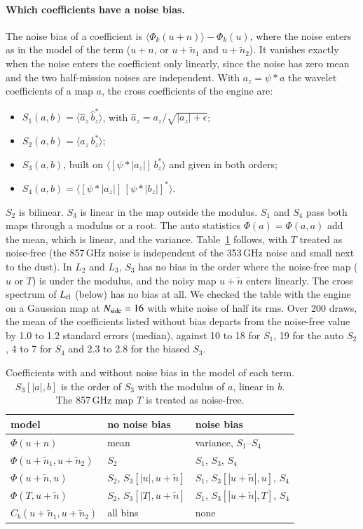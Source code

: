 \documentclass{aa}
\newcommand{\nside}{N_{\rm side}}
\begin{document}
\paragraph{Which coefficients have a noise bias.} The noise bias of a coefficient is $\langle\Phi_k(u+n)\rangle-\Phi_k(u)$, where the noise enters as in the model of the term ($u+n$, or $u+\tilde n_1$ and $u+\tilde n_2$). It vanishes exactly when the noise enters the coefficient only linearly, since the noise has zero mean and the two half-mission noises are independent. With $a_z=\psi*a$ the wavelet coefficients of a map $a$, the cross coefficients of the engine are:
\begin{itemize}
  \item $S_1(a,b)=\langle\hat a_z\,\hat b_z^*\rangle$, with $\hat a_z=a_z/\sqrt{|a_z|+\epsilon}$;
  \item $S_2(a,b)=\langle a_z\,b_z^*\rangle$;
  \item $S_3(a,b)$, built on $\langle[\psi*|a_z|]\,b_z^*\rangle$ and given in both orders;
  \item $S_4(a,b)=\langle[\psi*|a_z|]\,[\psi*|b_z|]^*\rangle$.
\end{itemize}
$S_2$ is bilinear. $S_3$ is linear in the map outside the modulus. $S_1$ and $S_4$ pass both maps through a modulus or a root. The auto statistics $\Phi(a)=\Phi(a,a)$ add the mean, which is linear, and the variance. Table~\ref{tab:bias} follows, with $T$ treated as noise-free (the 857\,GHz noise is independent of the 353\,GHz noise and small next to the dust). In $L_2$ and $L_3$, $S_3$ has no bias in the order where the noise-free map ($u$ or $T$) is under the modulus, and the noisy map $u+\tilde n$ enters linearly. The cross spectrum of $L_{\rm cl}$ (below) has no bias at all. We checked the table with the engine on a Gaussian map at $\nside=16$ with white noise of half its rms. Over 200 draws, the mean of the coefficients listed without bias departs from the noise-free value by 1.0 to 1.2 standard errors (median), against 10 to 18 for $S_1$, 19 for the auto $S_2$, 4 to 7 for $S_4$ and 2.3 to 2.8 for the biased $S_3$.

\begin{table}
  \caption{Coefficients with and without noise bias in the model of each term. $S_3[|a|,b]$ is the order of $S_3$ with the modulus of $a$, linear in $b$. The 857\,GHz map $T$ is treated as noise-free.}
  \label{tab:bias}
  \centering\small
  \begin{tabular}{lll}
    \hline\hline
    model & no noise bias & noise bias \\
    \hline
    $\Phi(u+n)$ & mean & variance, $S_1$--$S_4$ \\
    $\Phi(u+\tilde n_1,u+\tilde n_2)$ & $S_2$ & $S_1$, $S_3$, $S_4$ \\
    $\Phi(u+\tilde n,u)$ & $S_2$, $S_3[|u|,u+\tilde n]$ & $S_1$, $S_3[|u+\tilde n|,u]$, $S_4$ \\
    $\Phi(T,u+\tilde n)$ & $S_2$, $S_3[|T|,u+\tilde n]$ & $S_1$, $S_3[|u+\tilde n|,T]$, $S_4$ \\
    $C_b(u+\tilde n_1,u+\tilde n_2)$ & all bins & none \\
    \hline
  \end{tabular}
\end{table}
\end{document}
